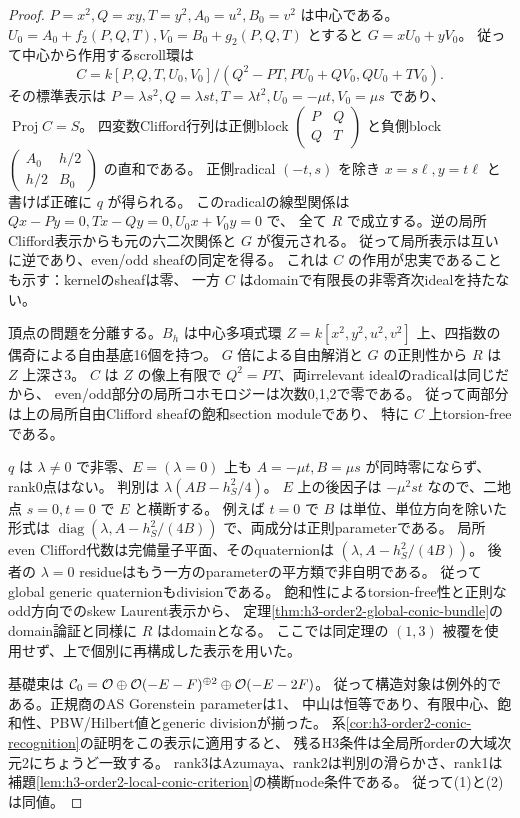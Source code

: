 \begin{proof}
$P=x^2,Q=xy,T=y^2,A_0=u^2,B_0=v^2$ は中心である。
$U_0=A_0+f_2(P,Q,T),V_0=B_0+g_2(P,Q,T)$ とすると
$G=xU_0+yV_0$。
従って中心から作用するscroll環は
\[
 C=k[P,Q,T,U_0,V_0]/(Q^2-PT,PU_0+QV_0,QU_0+TV_0).
\]
その標準表示は $P=\lambda s^2,Q=\lambda st,T=\lambda t^2,
U_0=-\mu t,V_0=\mu s$ であり、$\operatorname{Proj}C=S$。
四変数Clifford行列は正側block
$\left(\begin{smallmatrix}P&Q\\Q&T\end{smallmatrix}\right)$ と負側block
$\left(\begin{smallmatrix}A_0&h/2\\h/2&B_0\end{smallmatrix}\right)$ の直和である。
正側radical $(-t,s)$ を除き $x=s\ell,y=t\ell$ と書けば正確に $q$ が得られる。
このradicalの線型関係は $Qx-Py=0,Tx-Qy=0,U_0x+V_0y=0$ で、
全て $R$ で成立する。逆の局所Clifford表示からも元の六二次関係と $G$ が復元される。
従って局所表示は互いに逆であり、even/odd sheafの同定を得る。
これは $C$ の作用が忠実であることも示す：kernelのsheafは零、
一方 $C$ はdomainで有限長の非零斉次idealを持たない。

頂点の問題を分離する。$B_h$ は中心多項式環
$Z=k[x^2,y^2,u^2,v^2]$ 上、四指数の偶奇による自由基底16個を持つ。
$G$ 倍による自由解消と $G$ の正則性から $R$ は $Z$ 上深さ3。
$C$ は $Z$ の像上有限で $Q^2=PT$、両irrelevant idealのradicalは同じだから、
even/odd部分の局所コホモロジーは次数0,1,2で零である。
従って両部分は上の局所自由Clifford sheafの飽和section moduleであり、
特に $C$ 上torsion-freeである。

$q$ は $\lambda\ne0$ で非零、$E=(\lambda=0)$ 上も
$A=-\mu t,B=\mu s$ が同時零にならず、rank0点はない。
判別は $\lambda(AB-h_S^2/4)$。
$E$ 上の後因子は $-\mu^2st$ なので、二地点 $s=0,t=0$ で $E$ と横断する。
例えば $t=0$ で $B$ は単位、単位方向を除いた形式は
$\operatorname{diag}(\lambda,A-h_S^2/(4B))$ で、両成分は正則parameterである。
局所even Clifford代数は完備量子平面、そのquaternionは
$(\lambda,A-h_S^2/(4B))$。
後者の $\lambda=0$ residueはもう一方のparameterの平方類で非自明である。
従ってglobal generic quaternionもdivisionである。
飽和性によるtorsion-free性と正則なodd方向でのskew Laurent表示から、
定理\ref{thm:h3-order2-global-conic-bundle}のdomain論証と同様に $R$ はdomainとなる。
ここでは同定理の $(1,3)$ 被覆を使用せず、上で個別に再構成した表示を用いた。

基礎束は
$\mathcal C_0=\mathcal O\oplus\mathcal O(-E-F)^{\oplus2}\oplus\mathcal O(-E-2F)$。
従って構造対象は例外的である。正規商のAS Gorenstein parameterは1、
中山は恒等であり、有限中心、飽和性、PBW/Hilbert値とgeneric divisionが揃った。
系\ref{cor:h3-order2-conic-recognition}の証明をこの表示に適用すると、
残るH3条件は全局所orderの大域次元2にちょうど一致する。
rank3はAzumaya、rank2は判別の滑らかさ、rank1は
補題\ref{lem:h3-order2-local-conic-criterion}の横断node条件である。
従って(1)と(2)は同値。


\end{proof}
